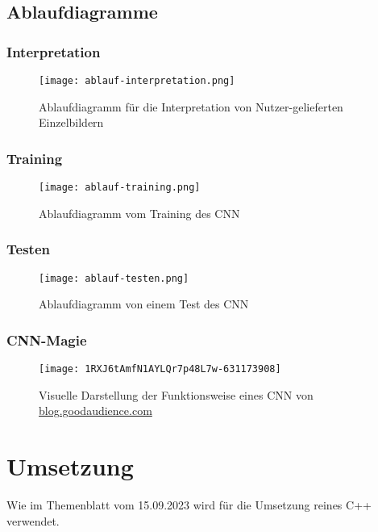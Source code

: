 \subsection{Ablaufdiagramme}
\label{sec:AnalyseAblaufdiagramme}

\subsubsection{Interpretation}
\label{sec:AnalyseInterpretation}
\begin{figure}[H]
	\centering
	\texttt{[image: ablauf-interpretation.png]}
	\caption{Ablaufdiagramm für die Interpretation von Nutzer-gelieferten Einzelbildern}
	\label{fig:analyseablauf-interpretation}
\end{figure}


\subsubsection{Training}
\label{sec:AnalyseTraining}
\begin{figure}[H]
	\centering
	\texttt{[image: ablauf-training.png]}
	\caption{Ablaufdiagramm vom Training des CNN}
	\label{fig:analyseablauf-training}
\end{figure}


\subsubsection{Testen}
\label{sec:AnalyseTesten}
\begin{figure}[H]
	\centering
	\texttt{[image: ablauf-testen.png]}
	\caption{Ablaufdiagramm von einem Test des CNN}
	\label{fig:analyseablauf-testen}
\end{figure}


\subsubsection{CNN-Magie}
\label{sec:AnalyseCNN-Magic}
\begin{figure}[H]
	\centering
	\texttt{[image: 1RXJ6tAmfN1AYLQr7p48L7w-631173908]}
	\caption{Visuelle Darstellung der Funktionsweise eines CNN von \href{https://blog.goodaudience.com/cnn-for-rnns-a-gentle-approach-to-use-cnns-for-nlp-53ab80768d43}{blog.goodaudience.com}}
	\label{fig:analyse1RXJ6tAmfN1AYLQr7p48L7w-631173908}
\end{figure}

\section{Umsetzung}
\label{sec:AnalyseUmsetzung}
Wie im Themenblatt vom 15.09.2023 wird für die Umsetzung reines C++ verwendet.

